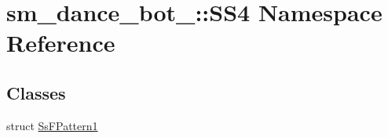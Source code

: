 \hypertarget{namespacesm__dance__bot__2_1_1SS4}{}\section{sm\+\_\+dance\+\_\+bot\+\_\+:\+:S\+S4 Namespace Reference}
\label{namespacesm__dance__bot__2_1_1SS4}
\subsection*{Classes}
\begin{DoxyCompactItemize}
\item 
struct \hyperlink{structsm__dance__bot__2_1_1SS4_1_1SsFPattern1}{Ss\+F\+Pattern1}
\end{DoxyCompactItemize}
